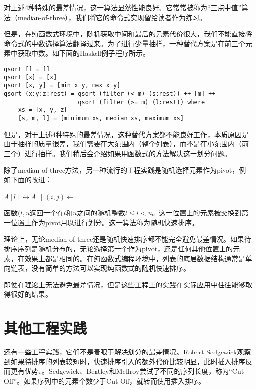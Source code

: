\documentclass[UTF8]{article}
\begin{document}
对上述4种特殊的最差情况，这一算法显然性能良好。它常常被称为“三点中值”算法（median-of-three），我们将它的命令式实现留给读者作为练习。

但是，在纯函数式环境中，随机获取中间和最后的元素代价很大，我们不能直接将命令式的中数选择算法翻译过来。为了进行少量抽样，一种替代方案是在前三个元素中获取中数。如下面的Haskell例子程序所示。

\lstset{language=Haskell}
\begin{lstlisting}[style=Haskell]
qsort [] = []
qsort [x] = [x]
qsort [x, y] = [min x y, max x y]
qsort (x:y:z:rest) = qsort (filter (< m) (s:rest)) ++ [m] ++
                     qsort (filter (>= m) (l:rest)) where
    xs = [x, y, z]
    [s, m, l] = [minimum xs, median xs, maximum xs]
\end{lstlisting}

但是，对于上述4种特殊的最差情况，这种替代方案都不能良好工作，本质原因是由于抽样的质量很差，我们需要在大范围内（整个列表），而不是在小范围内（前三个）进行抽样。我们稍后会介绍如果用函数式的方法解决这一划分问题。

除了median-of-three方法，另一种流行的工程实践是随机选择元素作为pivot，例如下面的改进：

\begin{algorithmic}[1]
    \State {} $A[l] \leftrightarrow A[$  $]$
    \State $(i, j) \gets $ 
    \State {}
    \State {}
  \EndIf
\EndProcedure
\end{algorithmic}

函数($l, u$返回一个在$l$和$u$之间的随机整数$l \leq i < u$。这一位置上的元素被交换到第一位置上作为pivot用以进行划分。这一算法称为\underline{随机快速排序}\cite{CLRS}。

理论上，无论median-of-three还是随机快速排序都不能完全避免最差情况。如果待排序序列是随机分布的，无论选择第一个作为pivot，还是任何其他位置上的元素，在效果上都是相同的。在纯函数式编程环境中，列表的底层数据结构通常是单向链表，没有简单的方法可以实现纯函数式的随机快速排序。

即使在理论上无法避免最差情况，但是这些工程上的实践在实际应用中往往能够取得很好的结果。

\section{其他工程实践}

还有一些工程实践，它们不是着眼于解决划分的最差情况。Robert Sedgewick观察到如果待排序的列表较短时，快速排序引入的额外代价比较明显，此时插入排序反而更有优势\cite{Bentley}、\cite{3-way-part}。Sedgewick、Bentley和McIlroy尝试了不同的序列长度，称为“Cut-Off”。如果序列中的元素个数少于Cut-Off，就转而使用插入排序。
\end{document}
